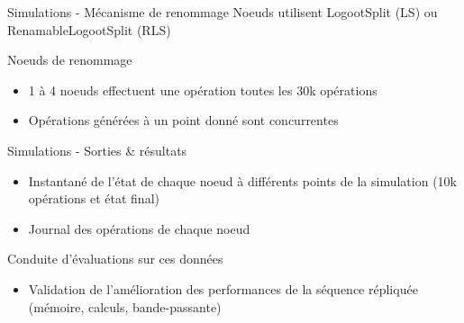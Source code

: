 \begin{frame}{Simulations - Mécanisme de renommage}
  Noeuds \alert{utilisent LogootSplit} (LS) ou \alert{RenamableLogootSplit} (RLS)
  \pause
  \begin{block}{Noeuds de renommage}
    \begin{itemize}
      \item 1 à 4 noeuds effectuent une \alert{opération \ren toutes les 30k opérations}
      \item Opérations \ren générées à un point donné sont \alert{concurrentes}
    \end{itemize}
  \end{block}
\end{frame}

\begin{frame}{Simulations - Sorties \& résultats}
  \begin{itemize}
    \item \alert{Instantané de l'état} de chaque noeud à différents points de la simulation (10k opérations et état final)
    \item \alert{Journal des opérations} de chaque noeud
  \end{itemize}
  \pause

  \begin{block}{Conduite d'évaluations sur ces données}
    \begin{itemize}
      \item Validation de l'amélioration des performances de la séquence répliquée (mémoire, calculs, bande-passante)
    \end{itemize}
  \end{block}

\end{frame}

